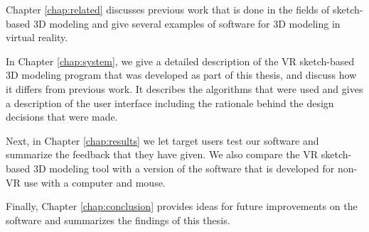 Chapter \ref{chap:related} discusses previous work that is done in the fields of sketch-based 3D modeling and give several examples of software for 3D modeling in virtual reality. 

In Chapter \ref{chap:system}, we give a detailed description of the VR sketch-based 3D modeling program that was developed as part of this thesis, and discuss how it differs from previous work. It describes the algorithms that were used and gives a description of the user interface including the rationale behind the design decisions that were made. 

Next, in Chapter \ref{chap:results} we let target users test our software and summarize the feedback that they have given. We also compare the VR sketch-based 3D modeling tool with a version of the software that is developed for non-VR use with a computer and mouse. 

Finally, Chapter \ref{chap:conclusion} provides ideas for future improvements on the software and summarizes the findings of this thesis.